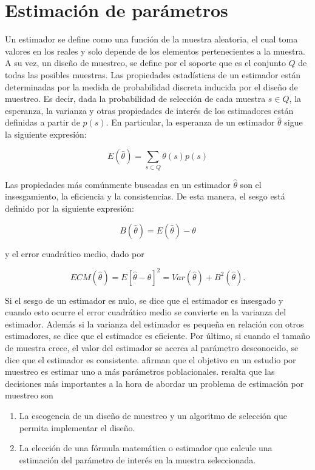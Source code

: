\documentclass[
  12pt,
  spanish,
]{book}
\providecommand{\tightlist}{%
  \setlength{\itemsep}{0pt}\setlength{\parskip}{0pt}}
\begin{document}
\hypertarget{estimaciuxf3n-de-paruxe1metros}{%
\chapter{Estimación de parámetros}\label{estimaciuxf3n-de-paruxe1metros}}

Un estimador se define como una función de la muestra aleatoria, el cual toma valores en los reales y solo depende de los elementos pertenecientes a la muestra. A su vez, un diseño de muestreo, se define por el soporte que es el conjunto \(Q\) de todas las posibles muestras. Las propiedades estadísticas de un estimador están determinadas por la medida de probabilidad discreta inducida por el diseño de muestreo. Es decir, dada la probabilidad de selección de cada muestra \(s \in Q\), la esperanza, la varianza y otras propiedades de interés de los estimadores están definidas a partir de \(p(s)\). En particular, la esperanza de un estimador \(\hat\theta\) sigue la siguiente expresión:

\[
E(\hat\theta) = \sum_{s\subset Q} \theta(s)p(s)
\]

Las propiedades más comúnmente buscadas en un estimador \(\hat\theta\) son el insesgamiento, la eficiencia y la consistencias. De esta manera, el sesgo está definido por la siguiente expresión:

\[
B(\hat\theta)=E(\hat\theta)-\theta
\]

y el error cuadrático medio, dado por

\[
ECM(\hat\theta)=E[\hat\theta-\theta]^2=Var(\hat\theta)+B^2(\hat\theta).
\]

Si el sesgo de un estimador es nulo, se dice que el estimador es insesgado y cuando esto ocurre el error cuadrático medio se convierte en la varianza del estimador. Además si la varianza del estimador es pequeña en relación con otros estimadores, se dice que el estimador es eficiente. Por último, si cuando el tamaño de muestra crece, el valor del estimador se acerca al parámetro desconocido, se dice que el estimador es consistente. \citet{Sarndal_Swensson_Wretman_2003} afirman que el objetivo en un estudio por muestreo es estimar uno a más parámetros poblacionales. \citet{Gutierrez_2016} resalta que las decisiones más importantes a la hora de abordar un problema de estimación por muestreo son

\begin{enumerate}
\def\labelenumi{\arabic{enumi}.}
\tightlist
\item
  La escogencia de un diseño de muestreo y un algoritmo de selección que permita implementar el diseño.
\item
  La elección de una fórmula matemática o estimador que calcule una estimación del parámetro de interés en la muestra seleccionada.
\end{enumerate}
\end{document}
